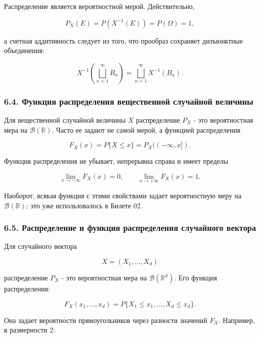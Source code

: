 \documentclass[
  11pt,
  a4paper,
]{article}
\begin{document}
Распределение является вероятностной мерой. Действительно,

\[
P_X(E)=P(X^{-1}(E))=P(\Omega)=1,
\]

а счетная аддитивность следует из того, что прообраз сохраняет
дизъюнктные объединения:

\[
X^{-1}\left(\bigsqcup_{n=1}^{\infty}B_n\right)
=
\bigsqcup_{n=1}^{\infty}X^{-1}(B_n).
\]

\subsubsection{6.4. Функция распределения вещественной случайной
величины}\label{ux444ux443ux43dux43aux446ux438ux44f-ux440ux430ux441ux43fux440ux435ux434ux435ux43bux435ux43dux438ux44f-ux432ux435ux449ux435ux441ux442ux432ux435ux43dux43dux43eux439-ux441ux43bux443ux447ux430ux439ux43dux43eux439-ux432ux435ux43bux438ux447ux438ux43dux44b}

Для вещественной случайной величины \(X\) распределение \(P_X\) - это
вероятностная мера на \(\mathcal B(\mathbb R)\). Часто ее задают не
самой мерой, а функцией распределения

\[
F_X(x)=P\{X\le x\}=P_X((-\infty,x]).
\]

Функция распределения не убывает, непрерывна справа и имеет пределы

\[
\lim_{x\to-\infty}F_X(x)=0,\qquad
\lim_{x\to+\infty}F_X(x)=1.
\]

Наоборот, всякая функция с этими свойствами задает вероятностную меру на
\(\mathcal B(\mathbb R)\); это уже использовалось в Билете 02.

\subsubsection{6.5. Распределение и функция распределения случайного
вектора}\label{ux440ux430ux441ux43fux440ux435ux434ux435ux43bux435ux43dux438ux435-ux438-ux444ux443ux43dux43aux446ux438ux44f-ux440ux430ux441ux43fux440ux435ux434ux435ux43bux435ux43dux438ux44f-ux441ux43bux443ux447ux430ux439ux43dux43eux433ux43e-ux432ux435ux43aux442ux43eux440ux430}

Для случайного вектора

\[
X=(X_1,\ldots,X_d)
\]

распределение \(P_X\) - это вероятностная мера на
\(\mathcal B(\mathbb R^d)\). Его функция распределения:

\[
F_X(x_1,\ldots,x_d)
=
P\{X_1\le x_1,\ldots,X_d\le x_d\}.
\]

Она задает вероятности прямоугольников через разности значений \(F_X\).
Например, в размерности \(2\):
\end{document}
